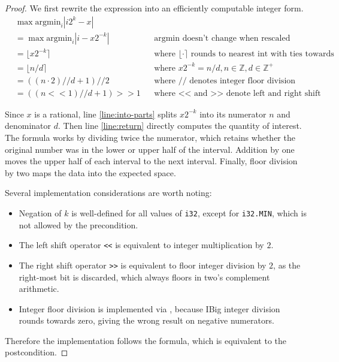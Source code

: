 \documentclass{article}
\begin{document}
\begin{proof}
    We first rewrite the expression into an efficiently computable integer form.
    \begin{align}
        &\max \mathrm{argmin}_i |i 2^k - x| \\
        &= \max \mathrm{argmin}_i |i - x 2^{-k}| &&\text{argmin doesn't change when rescaled}\\
        &= \lfloor x 2^{-k}\rceil &&\text{where } \lfloor \cdot \rceil \text{ rounds to nearest int with ties towards infinity} \\
        &= \lfloor n / d \rceil &&\text{where } x 2^{-k} = n / d, n \in \mathbb{Z}, d \in \mathbb{Z}^+ \\
        &= ((n \cdot 2) // d + 1) // 2 &&\text{where // denotes integer floor division} \\
        &= ((n << 1) // d + 1) >> 1 &&\text{where <{}< and >{}> denote left and right shift}
    \end{align}

    Since $x$ is a rational, line \ref{line:into-parts} splits $x 2^{-k}$ into its numerator $n$ and denominator $d$.
    Then line \ref{line:return} directly computes the quantity of interest.
    The formula works by dividing twice the numerator, which retains whether the original number was in the lower or upper half of the interval.
    Addition by one moves the upper half of each interval to the next interval.
    Finally, floor division by two maps the data into the expected space.

    Several implementation considerations are worth noting:
    \begin{itemize}
        \item Negation of $k$ is well-defined for all values of \texttt{i32}, 
            except for \texttt{i32.MIN}, which is not allowed by the precondition.
        \item The left shift operator \texttt{<{}<} is equivalent to integer multiplication by $2$.
        \item The right shift operator \texttt{>{}>} is equivalent to floor integer division by $2$,
            as the right-most bit is discarded, which always floors in two's complement arithmetic.
        \item Integer floor division is implemented via ,
            because IBig integer division rounds towards zero, giving the wrong result on negative numerators.
    \end{itemize}

    Therefore the implementation follows the formula, which is equivalent to the postcondition.
\end{proof}
\end{document}
